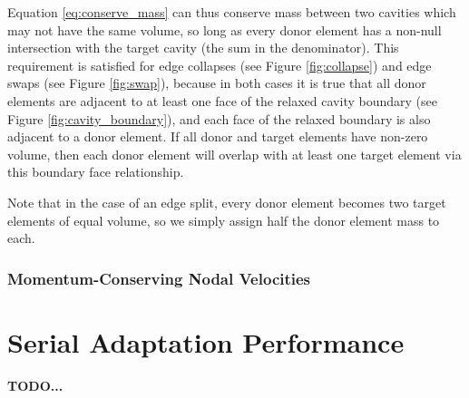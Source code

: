 Equation \ref{eq:conserve_mass} can thus conserve mass between
two cavities which may not have the same volume, so long as every
donor element has a non-null intersection with the target cavity
(the sum in the denominator).
This requirement is satisfied for edge collapses (see Figure
\ref{fig:collapse}) and edge swaps (see Figure \ref{fig:swap}),
because in both cases it is true that
all donor elements are adjacent to at least one face of
the relaxed cavity boundary (see Figure \ref{fig:cavity_boundary}),
and each face of the relaxed boundary is also adjacent to
a donor element.
If all donor and target elements have non-zero volume, then
each donor element will overlap with at least one target element
via this boundary face relationship.

Note that in the case of an edge split, every donor element
becomes two target elements of equal volume, so we simply
assign half the donor element mass to each.

\subsubsection{Momentum-Conserving Nodal Velocities}
\label{sec:conserve_momentum}

\section{Serial Adaptation Performance}

{\bf TODO... }




